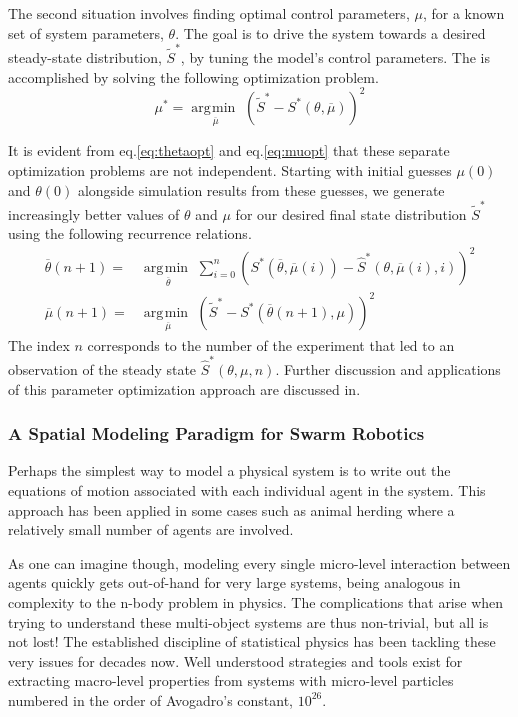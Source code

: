 \documentclass[11pt, onecolumn, compsoc, letterpaper]{article}
\DeclareMathOperator*{\argmin}{\arg\!\min\>}
\begin{document}
The second situation involves finding optimal control parameters, $\mu$, for a known set of system parameters, $\theta$. The goal is to drive the system towards a desired steady-state distribution, $\tilde{S}^*$, by tuning the model's control parameters. The is accomplished by solving the following optimization problem.
\begin{equation}
	\mu^* = \underset{\overline{\mu}}{\argmin}\left(\tilde{S}^* - S^*(\theta, \overline{\mu})\right)^2 \label{eq:muopt}
\end{equation}

It is evident from eq.\eqref{eq:thetaopt} and eq.\eqref{eq:muopt} that these separate optimization problems are not independent. Starting with initial guesses $\mu(0)$ and $\theta(0)$ alongside simulation results from these guesses, we generate increasingly better values of $\theta$ and $\mu$ for our desired final state distribution $\tilde{S}^*$ using the following recurrence relations.
\begin{align}\label{eq:paramrel}
	\overline{\theta}(n + 1) = & \underset{\overline{\theta}}{\argmin}\sum\limits_{i=0}^{n}\left(S^*(\overline{\theta},\overline{\mu}(i)) - \hat{S}^*(\theta, \overline{\mu}(i), i)\right)^2\\
	\overline{\mu}(n + 1) = & \underset{\overline{\mu}}{\argmin}\left(\tilde{S}^* - S^*(\overline{\theta}(n + 1), \mu)\right)^2
\end{align}
The index $n$ corresponds to the number of the experiment that led to an observation of the steady state $\hat{S}^*(\theta, \mu, n)$. Further discussion and applications of this parameter optimization approach are discussed in\cite{Correll2006a,Correll2008}.

\subsubsection{A Spatial Modeling Paradigm for Swarm Robotics}
Perhaps the simplest way to model a physical system is to write out the equations of motion associated with each individual agent in the system. This approach has been applied in some cases such as animal herding\cite{Correll2008b} where a relatively small number of agents are involved. 

As one can imagine though, modeling every single micro-level interaction between agents quickly gets out-of-hand for very large systems, being analogous in complexity to the n-body problem in physics. The complications that arise when trying to understand these multi-object systems are thus non-trivial, but all is not lost! The established discipline of statistical physics has been tackling these very issues for decades now. Well understood strategies and tools exist for extracting macro-level properties from systems with micro-level particles numbered in the order of Avogadro's constant, $10^{26}$.
\end{document}
